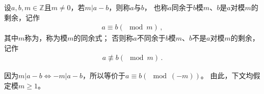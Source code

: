 \begin{definition}
    设$a,b,m\in\mathbb{Z}$且$m\neq0$，若$m|a-b$，则称$a$与$b$，
    也称$a$同余于$b$模$m$、$b$是$a$对模$m$的剩余，记作
    \begin{align}\label{eq:7.ex02.01}
        a\equiv b(\mod m)\, ,
    \end{align}
    其中$m$称为，称为模$m$的同余式；
    否则称$a$不同余于$b$模$m$、$b$不是$a$对模$m$的剩余，记作
    \begin{align}
        a\not\equiv b(\mod m)\, .
    \end{align}
\end{definition}

\begin{notation}
    因为$m|a-b\Leftrightarrow -m|a-b$，所以等价于$a\equiv b(\mod (-m))$。
    由此，下文均假定模$m\ge1$。
\end{notation}